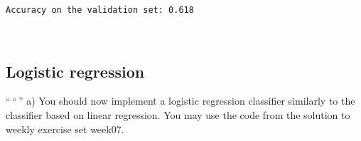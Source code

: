 \documentclass[11pt]{article}
\begin{document}
    \begin{Verbatim}[commandchars=\\\{\}]
Accuracy on the validation set: 0.618
    \end{Verbatim}

    \begin{center}
    \end{center}
    { \hspace*{\fill} \\}
    
    \hypertarget{logistic-regression}{%
\subsection{Logistic regression}\label{logistic-regression}}

``\,``\,'' a) You should now implement a logistic regression classifier
similarly to the classifier based on linear regression. You may use the
code from the solution to weekly exercise set week07.
\end{document}
